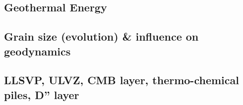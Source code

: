 \subsection{Geothermal Energy} 

{\scriptsize
\noindent
\cite{quxm15}
\cite{revf19}
}

\subsection{Grain size (evolution) \& influence on geodynamics}
\label{sec:topics:gsev}

{\scriptsize
\noindent
\cite{kara84}
\cite{brcp99}
\cite{dets01}\cite{solo01}
\cite{soet02}
\cite{hapa03}\cite{reyu03}
\cite{sore08}
\cite{rorb11}
\cite{beri13}
\cite{besr14}
\cite{thrk15}\cite{tukb15}\cite{pevp15}
\cite{ceww17}\cite{daef17}\cite{mube17}\cite{scdu17}
\cite{bemu18}\cite{bezb18}\cite{mube18}
}

\subsection{LLSVP, ULVZ, CMB layer, thermo-chemical piles, D'' layer}


